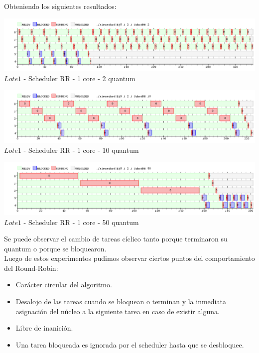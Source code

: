 Obteniendo los siguientes resultados:

\begin{center}

    
	\includegraphics[width=450pt]{./Test/ej5_2.png}
	{$Lote 1$ - Scheduler RR - 1 core - 2 quantum}	
 
\end{center}

\begin{center}
  	\includegraphics[width=450pt]{./Test/ej5_10.png}
	  {$Lote 1$ - Scheduler RR - 1 core - 10 quantum}	
\end{center}

\begin{center}
  	\includegraphics[width=450pt]{./Test/ej5_50.png}
	  {$Lote 1$ - Scheduler RR - 1 core - 50 quantum}	
\end{center}

\indent Se puede observar el cambio de tareas cíclico tanto porque terminaron su quantum o porque se bloquearon.\\


\indent Luego de estos experimentos pudimos observar ciertos puntos del comportamiento del Round-Robin:\\
\begin{itemize}
\item  Carácter circular del algoritmo.
\item  Desalojo de las tareas cuando se bloquean o terminan y la inmediata asignación del núcleo a la siguiente tarea en caso de existir alguna.
\item  Libre de inanición.
\item  Una tarea bloqueada es ignorada por el scheduler hasta que se desbloquee.
\end{itemize}

